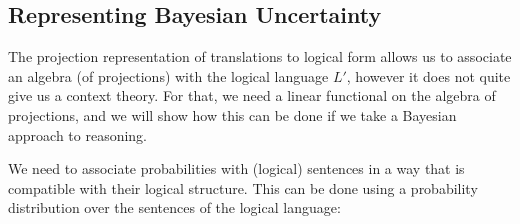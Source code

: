 \subsection{Representing Bayesian Uncertainty}

The projection representation of translations to logical form allows us to associate an algebra (of projections) with the logical language $L'$, however it does not quite give us a context theory. For that, we need a linear functional on the algebra of projections, and we will show how this can be done if we take a Bayesian approach to reasoning.

We need to associate probabilities with (logical) sentences in a way that is compatible with their logical structure. This can be done using a probability distribution over the sentences of the logical language:




